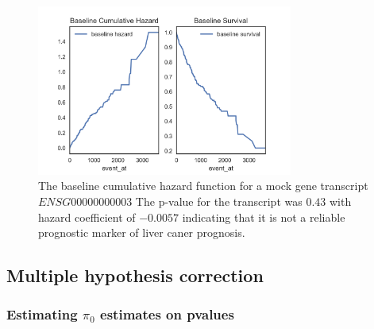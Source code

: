 \documentclass[11pt]{article}
\begin{document}
\begin{figure}[tbh]
    \centering
      \includegraphics[width=0.75\textwidth]{survial_plot_one_mock_gene.png}
    \caption{The baseline cumulative hazard function for a mock gene transcript $ENSG00000000003$   The p-value for the transcript was $0.43$ with hazard coefficient of $-0.0057$ indicating that it is not a reliable prognostic marker of liver caner prognosis.}
    \label{fig:Baseline_hazard_and_survival}
\end{figure}
  		
	\subsection { Multiple hypothesis correction }
	
	\subsubsection {Estimating $\pi_0$ estimates on pvalues}
	
\end{document}
